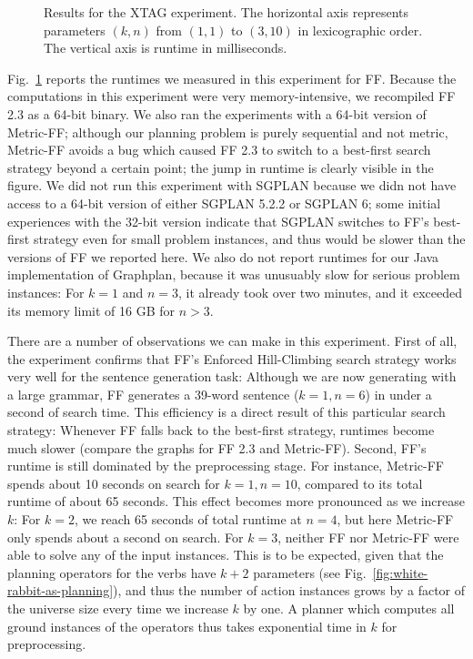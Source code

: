 \begin{figure}
  \centering
  
  \caption{Results for the XTAG experiment. The horizontal axis
    represents parameters $(k,n)$ from $(1,1)$ to $(3,10)$ in
    lexicographic order. The vertical axis is runtime in milliseconds.}
  \label{fig:xtag-graph}
\end{figure}

Fig.~\ref{fig:xtag-graph} reports the runtimes we measured in this
experiment for FF. Because the computations in this experiment were
very memory-intensive, we recompiled FF 2.3 as a 64-bit binary. We
also ran the experiments with a 64-bit version of Metric-FF; although
our planning problem is purely sequential and not metric, Metric-FF
avoids a bug which caused FF 2.3 to switch to a best-first search
strategy beyond a certain point; the jump in runtime is clearly
visible in the figure. We did not run this experiment with SGPLAN
because we didn not have access to a 64-bit version of either SGPLAN
5.2.2 or SGPLAN 6; some initial experiences with the 32-bit version
indicate that SGPLAN switches to FF's best-first strategy even for
small problem instances, and thus would be slower than the versions of
FF we reported here. We also do not report runtimes for our Java
implementation of Graphplan, because it was unusuably slow for serious
problem instances: For $k=1$ and $n=3$, it already took over two
minutes, and it exceeded its memory limit of 16 GB for
$n>3$. 

There are a number of observations we can make in this
experiment. First of all, the experiment confirms that FF's Enforced
Hill-Climbing search strategy works very well for the sentence
generation task: Although we are now generating with a large grammar,
FF generates a 39-word sentence ($k=1,n=6$) in under a second of
search time. This efficiency is a direct result of this particular
search strategy: Whenever FF falls back to the best-first strategy,
runtimes become much slower (compare the graphs for FF 2.3 and
Metric-FF). Second, FF's runtime is still dominated by the
preprocessing stage. For instance, Metric-FF spends about 10 seconds
on search for $k=1,n=10$, compared to its total runtime of about 65
seconds. This effect becomes more pronounced as we increase $k$: For
$k=2$, we reach 65 seconds of total runtime at $n=4$, but here
Metric-FF only spends about a second on search. For $k=3$, neither FF
nor Metric-FF were able to solve any of the input
instances.  This is to be expected, given that the planning
operators for the verbs have $k+2$ parameters (see
Fig.~\ref{fig:white-rabbit-as-planning}), and thus the number of
action instances grows by a factor of the universe size every time we
increase $k$ by one. A planner which computes all ground instances of
the operators thus takes exponential time in $k$ for preprocessing.




